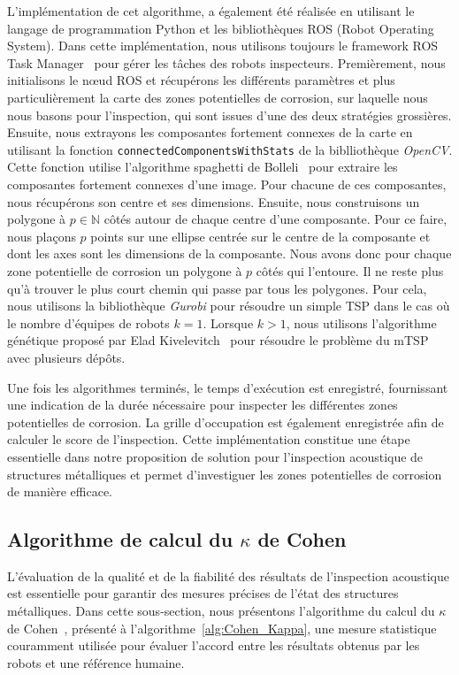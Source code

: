 \documentclass[english,RandD]{rapportPFE}  %
\begin{document}
			L'implémentation de cet algorithme, a également été réalisée en utilisant le langage de programmation Python et les bibliothèques ROS (Robot Operating System).
			Dans cette implémentation, nous utilisons toujours le framework ROS Task Manager~\cite{ROSTaskManager} pour gérer les tâches des robots inspecteurs.
			Premièrement, nous initialisons le nœud ROS et récupérons les différents paramètres et plus particulièrement la carte des zones potentielles de corrosion, sur laquelle nous nous basons pour l'inspection, qui sont issues d'une des deux stratégies grossières.
			Ensuite, nous extrayons les composantes fortement connexes de la carte en utilisant la fonction \texttt{connectedComponentsWithStats} de la biblliothèque \textit{OpenCV}.
			Cette fonction utilise l'algorithme spaghetti de Bolleli~\cite{BolelliSpaghetti} pour extraire les composantes fortement connexes d'une image.
			Pour chacune de ces composantes, nous récupérons son centre et ses dimensions.
			Ensuite, nous construisons un polygone à $p \in \mathbb{N}$ côtés autour de chaque centre d'une composante.
			Pour ce faire, nous plaçons $p$ points sur une ellipse centrée sur le centre de la composante et dont les axes sont les dimensions de la composante.
			Nous avons donc pour chaque zone potentielle de corrosion un polygone à $p$ côtés qui l'entoure.
			Il ne reste plus qu'à trouver le plus court chemin qui passe par tous les polygones.
			Pour cela, nous utilisons la bibliothèque \textit{Gurobi} pour résoudre un simple TSP dans le cas où le nombre d'équipes de robots $k = 1$.
			Lorsque $k > 1$, nous utilisons l'algorithme génétique proposé par Elad Kivelevitch~\cite{MDMTSPV_GA} pour résoudre le problème du mTSP avec plusieurs dépôts.

			Une fois les algorithmes terminés, le temps d'exécution est enregistré, fournissant une indication de la durée nécessaire pour inspecter les différentes zones potentielles de corrosion.
			La grille d'occupation est également enregistrée afin de calculer le score de l'inspection.
			Cette implémentation constitue une étape essentielle dans notre proposition de solution pour l'inspection acoustique de structures métalliques et permet d'investiguer les zones potentielles de corrosion de manière efficace.
		\subsection*{Algorithme de calcul du $\kappa$ de Cohen}
			L'évaluation de la qualité et de la fiabilité des résultats de l'inspection acoustique est essentielle pour garantir des mesures précises de l'état des structures métalliques.
			Dans cette sous-section, nous présentons l'algorithme du calcul du $\kappa$ de Cohen~\cite{enwiki:1130024730}, présenté à l'algorithme~\ref{alg:Cohen_Kappa}, une mesure statistique couramment utilisée pour évaluer l'accord entre les résultats obtenus par les robots et une référence humaine.
\end{document}
